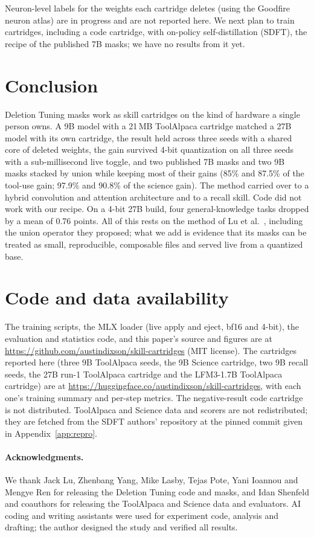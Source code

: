 \documentclass[11pt]{article}
\begin{document}
Neuron-level labels for the weights each cartridge deletes (using the Goodfire neuron atlas) are in progress and are not reported here. We next plan to train cartridges, including a code cartridge, with on-policy self-distillation (SDFT), the recipe of the published 7B masks; we have no results from it yet.

\section{Conclusion}

Deletion Tuning masks work as skill cartridges on the kind of hardware a single person owns. A 9B model with a 21\,MB ToolAlpaca cartridge matched a 27B model with its own cartridge, the result held across three seeds with a shared core of deleted weights, the gain survived 4-bit quantization on all three seeds with a sub-millisecond live toggle, and two published 7B masks and two 9B masks stacked by union while keeping most of their gains (85\% and 87.5\% of the tool-use gain; 97.9\% and 90.8\% of the science gain). The method carried over to a hybrid convolution and attention architecture and to a recall skill. Code did not work with our recipe. On a 4-bit 27B build, four general-knowledge tasks dropped by a mean of 0.76 points. All of this rests on the method of Lu et al.\ \citep{lu2026deleting}, including the union operator they proposed; what we add is evidence that its masks can be treated as small, reproducible, composable files and served live from a quantized base.

\section*{Code and data availability}
The training scripts, the MLX loader (live apply and eject, bf16 and 4-bit), the evaluation and statistics code, and this paper's source and figures are at \url{https://github.com/austindixson/skill-cartridges} (MIT license). The cartridges reported here (three 9B ToolAlpaca seeds, the 9B Science cartridge, two 9B recall seeds, the 27B run-1 ToolAlpaca cartridge and the LFM3-1.7B ToolAlpaca cartridge) are at \url{https://huggingface.co/austindixson/skill-cartridges}, with each one's training summary and per-step metrics. The negative-result code cartridge is not distributed. ToolAlpaca and Science data and scorers are not redistributed; they are fetched from the SDFT authors' repository at the pinned commit given in Appendix~\ref{app:repro}.

\paragraph{Acknowledgments.} We thank Jack Lu, Zhenbang Yang, Mike Lasby, Tejas Pote, Yani Ioannou and Mengye Ren for releasing the Deletion Tuning code and masks, and Idan Shenfeld and coauthors for releasing the ToolAlpaca and Science data and evaluators. AI coding and writing assistants were used for experiment code, analysis and drafting; the author designed the study and verified all results.
\end{document}
